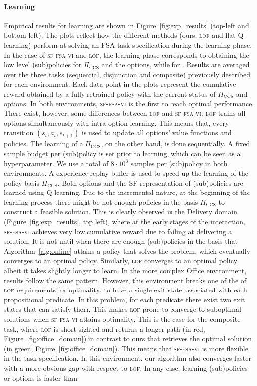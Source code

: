 \paragraph{Learning} Empirical results for learning are shown in Figure~\ref{fig:exp_results} (top-left and bottom-left). The plots reflect how the different methods (ours, \textsc{lof} and flat Q-learning) perform at solving an FSA task specification during the learning phase. In the case of \textsc{sf-fsa-vi} and \textsc{lof}, the learning phase corresponds to obtaining the low level (sub)policies for $\Pi_\text{CCS}$ and the options, while for . Results are averaged over the three tasks (sequential, disjunction and composite) previously described for each environment. Each data point in the plots represent the cumulative reward obtained by a fully retrained policy with the current status of $\Pi_\text{CCS}$ and options. In both environments, \textsc{sf-fsa-vi} is the first to reach optimal performance. There exist, however, some differences between \textsc{lof} and \textsc{sf-fsa-vi}. \textsc{lof} trains all options simultaneously with intra-option learning. This means that, every transition $(s_t, a_t, s_{t+1})$ is used to update all options' value functions and policies. The learning of a $\Pi_\text{CCS}$, on the other hand, is done sequentially. A fixed sample budget per (sub)policy is set prior to learning, which can be seen as a hyperparameter. We use a total of $8\cdot 10^3$ samples per (sub)policy in both environments. A experience replay buffer is used to speed up the learning of the policy basis $\Pi_\text{CCS}$. Both options and the SF representation of (sub)policies are learned using Q-learning. Due to the incremental nature, at the beginning of the learning process there might be not enough policies in the basis $\Pi_\text{CCS}$ to construct a feasible solution. This is clearly observed in the Delivery domain (Figure~\ref{fig:exp_results}, top left), where at the early stages of the interaction, \textsc{sf-fsa-vi} achieves very low cumulative reward due to failing at delivering a solution. It is not until when there are enough (sub)policies in the basis that Algorithm~\ref{alg:online} attains a policy that solves the problem, which eventually converges to an optimal policy. Similarly, \textsc{lof} converges to an optimal policy albeit it takes slightly longer to learn. In the more complex Office environment, results follow the same pattern. However, this environment breaks one of the of \textsc{lof} requirements for optimality: to have a single exit state associated with each propositional predicate. In this problem, for each predicate there exist two exit states that can satisfy them. This makes \textsc{lof} prone to converge to suboptimal solutions when \textsc{sf-fsa-vi} attains optimality. This is the case for the composite task, where \textsc{lof} is short-sighted and returns a longer path (in red, Figure~\ref{fig:office_domain}) in contrast to ours that retrieves the optimal solution (in green, Figure~\ref{fig:office_domain}). This means that \textsc{sf-fsa-vi} is more flexible in the task specification. In this environment, our algorithm also converges faster with a more obvious gap with respect to \textsc{lof}. In any case, learning (sub)policies or options is faster than 